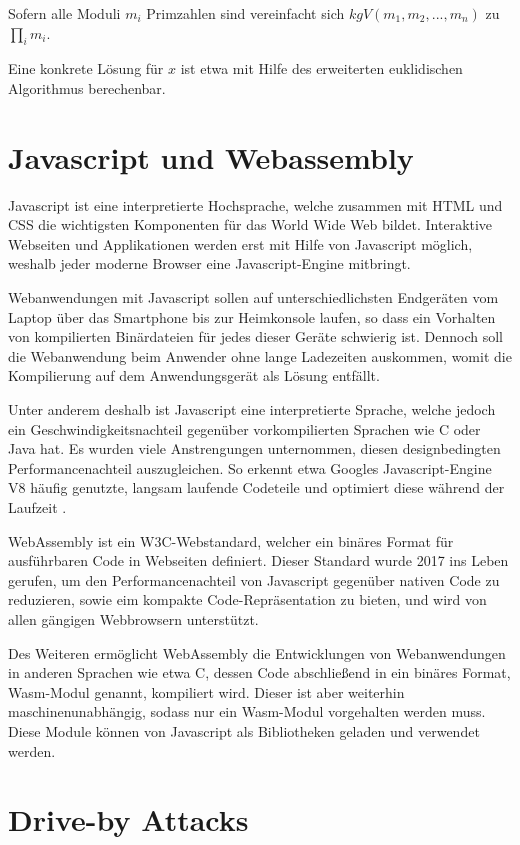 Sofern alle Moduli $m_i$ Primzahlen sind vereinfacht sich $kgV(m_1,m_2,...,m_n)$ zu $\prod_i m_i$.

Eine konkrete Lösung für $x$ ist etwa mit Hilfe des erweiterten euklidischen Algorithmus berechenbar.


\section{Javascript und Webassembly}

Javascript ist eine interpretierte Hochsprache, welche zusammen mit HTML und CSS die wichtigsten Komponenten für das World Wide Web bildet. 
Interaktive Webseiten und Applikationen werden erst mit Hilfe von Javascript möglich, weshalb jeder moderne Browser eine Javascript-Engine mitbringt.

Webanwendungen mit Javascript sollen auf unterschiedlichsten Endgeräten vom Laptop über das Smartphone bis zur Heimkonsole laufen, so dass ein Vorhalten von kompilierten Binärdateien für jedes dieser Geräte schwierig ist. 
Dennoch soll die Webanwendung beim Anwender ohne lange Ladezeiten auskommen, womit die Kompilierung auf dem Anwendungsgerät als Lösung entfällt.

Unter anderem deshalb ist Javascript eine interpretierte Sprache, welche jedoch ein Geschwindigkeitsnachteil gegenüber vorkompilierten Sprachen wie C oder Java hat.
Es wurden viele Anstrengungen unternommen, diesen designbedingten Performancenachteil auszugleichen. 
So erkennt etwa Googles Javascript-Engine V8 häufig genutzte, langsam laufende Codeteile und optimiert diese während der Laufzeit \cite{GoogleTurboFan}.

WebAssembly ist ein W3C-Webstandard, welcher ein binäres Format für ausführbaren Code in Webseiten definiert. 
Dieser Standard wurde 2017 ins Leben gerufen, um den Performancenachteil von Javascript gegenüber nativen Code zu reduzieren, sowie eim kompakte Code-Repräsentation zu bieten, und wird von allen gängigen Webbrowsern unterstützt.

Des Weiteren ermöglicht WebAssembly die Entwicklungen von Webanwendungen in anderen Sprachen wie etwa C, dessen Code abschließend in ein binäres Format, Wasm-Modul genannt, kompiliert wird.
Dieser ist aber weiterhin maschinenunabhängig, sodass nur ein Wasm-Modul vorgehalten werden muss.
Diese Module können von Javascript als Bibliotheken geladen und verwendet werden.

\section{Drive-by Attacks}


